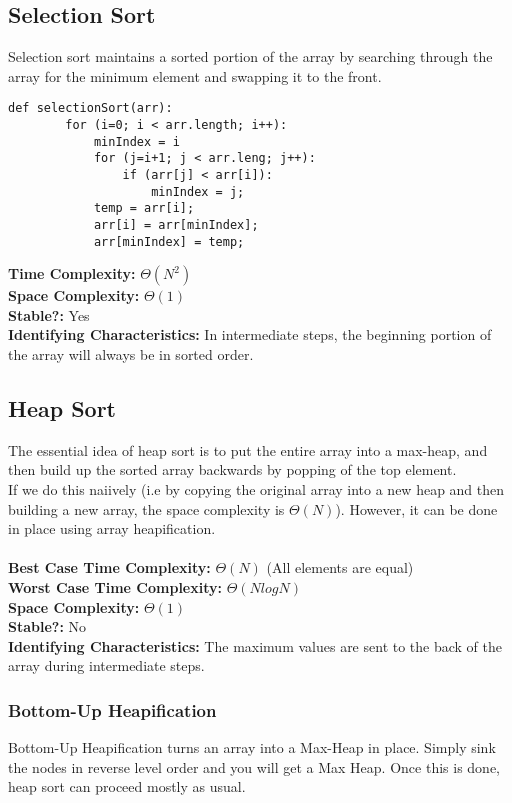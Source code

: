 \documentclass{article}
\begin{document}
\subsection{Selection Sort}
Selection sort maintains a sorted portion of the array by searching through the array for the minimum element and swapping it to the front.
\begin{lstlisting}[]
    def selectionSort(arr):
        for (i=0; i < arr.length; i++):
            minIndex = i
            for (j=i+1; j < arr.leng; j++):
                if (arr[j] < arr[i]):
                    minIndex = j;
            temp = arr[i];
            arr[i] = arr[minIndex];
            arr[minIndex] = temp;
\end{lstlisting}
\textbf{Time Complexity: } $\Theta(N^2)$\\
\textbf{Space Complexity: } $\Theta(1)$\\
\textbf{Stable?: } Yes\\
\textbf{Identifying Characteristics: } In intermediate steps, the beginning portion of the array will always be in sorted order. 
\subsection{Heap Sort}
The essential idea of heap sort is to put the entire array into a max-heap, and then build up the sorted array backwards by popping of the top element.\\
If we do this naiively (i.e by copying the original array into a new heap and then building a new array, the space complexity is $\Theta(N)$). However, it can be done in place
using array heapification.\\\\
\textbf{Best Case Time Complexity: }$\Theta(N)$ (All elements are equal)\\
\textbf{Worst Case Time Complexity: }$\Theta(NlogN)$\\
\textbf{Space Complexity: }$\Theta(1)$\\
\textbf{Stable?: }No\\
\textbf{Identifying Characteristics: }The maximum values are sent to the back of the array during intermediate steps.
\subsubsection{Bottom-Up Heapification}
Bottom-Up Heapification turns an array into a Max-Heap in place.
Simply sink the nodes in reverse level order and you will get a Max Heap.
Once this is done, heap sort can proceed mostly as usual.
\end{document}
